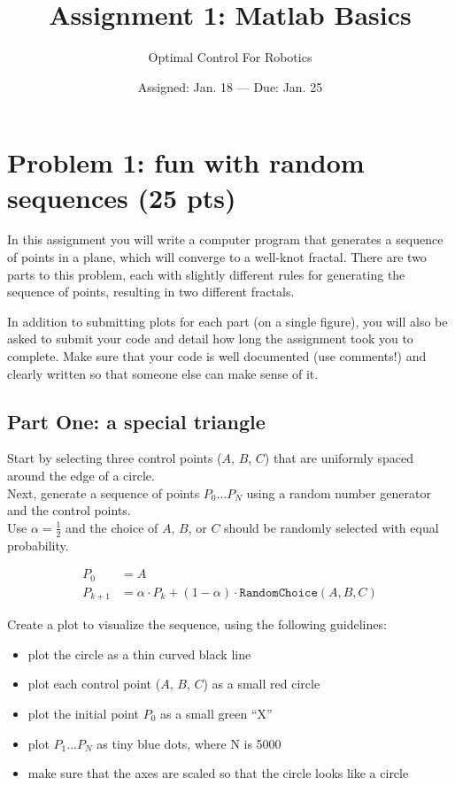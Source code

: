 

\title{Assignment 1:  Matlab Basics}
\date{Assigned:  Jan. 18  ---  Due:  Jan. 25}
\author{Optimal Control For Robotics}
\maketitle

\section*{Problem 1: fun with random sequences  (25 pts)}

In this assignment you will write a computer program that generates
a sequence of points in a plane, which will converge to a well-knot fractal.
There are two parts to this problem, each with slightly
different rules for generating the sequence of points, resulting in two different fractals.

\par
In addition to submitting plots for each part (on a single figure), you will
also be asked to submit your code and detail how long the assignment took you
to complete. Make sure that your code is well documented (use comments!) and
clearly written so that someone else can make sense of it.

\subsection*{Part One:  a special triangle}
Start by selecting three control points ($A$, $B$, $C$)
that are uniformly spaced around the edge of a circle.\\
Next, generate a sequence of points $P_0 ... P_N$
using a random number generator and the control points. \\
Use $\alpha = \tfrac{1}{2}$ and
the choice of $A$, $B$, or $C$ should be randomly selected with equal probability.

\begin{align}
  P_0 &= A \\
  P_{k+1} &= \alpha \cdot P_k + (1 - \alpha) \cdot \texttt{RandomChoice}(A, B, C)
\end{align}

Create a plot to visualize the sequence, using the following guidelines:
\vspace{-0.3em} \begin{itemize}  \setlength\itemsep{0em}
\item plot the circle as a thin curved black line
\item plot each control point ($A$, $B$, $C$) as a small red circle
\item plot the initial point $P_0$ as a small green ``X''
\item plot $P_1 ... P_N$ as tiny blue dots, where N is 5000
\item make sure that the axes are scaled so that the circle looks like a circle
\end{itemize}

